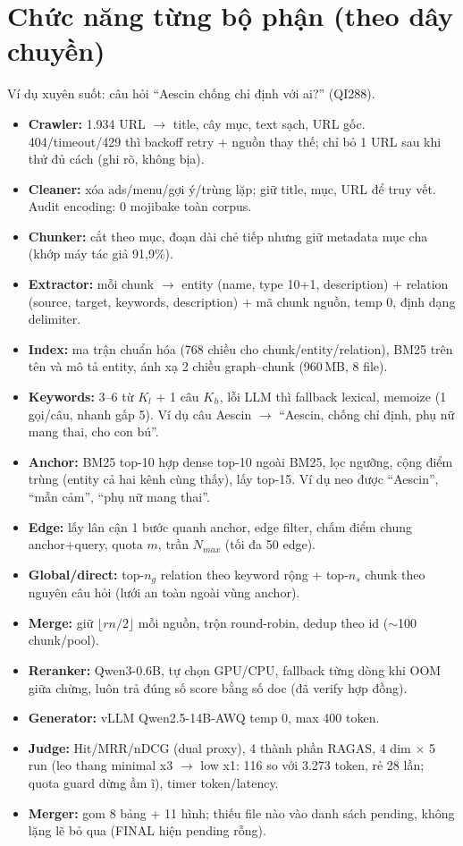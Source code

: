 \documentclass[12pt,a4paper]{article}
\begin{document}
\section{Chức năng từng bộ phận (theo dây chuyền)}
Ví dụ xuyên suốt: câu hỏi ``Aescin chống chỉ định với ai?'' (QI288).
\begin{itemize}[leftmargin=*]
\item \textbf{Crawler:} 1.934 URL $\rightarrow$ title, cây mục, text sạch, URL
gốc. 404/timeout/429 thì backoff retry + nguồn thay thế; chỉ bỏ 1 URL sau khi
thử đủ cách (ghi rõ, không bịa).
\item \textbf{Cleaner:} xóa ads/menu/gợi ý/trùng lặp; giữ title, mục, URL để
truy vết. Audit encoding: 0 mojibake toàn corpus.
\item \textbf{Chunker:} cắt theo mục, đoạn dài chẻ tiếp nhưng giữ metadata
mục cha (khớp máy tác giả 91,9\%).
\item \textbf{Extractor:} mỗi chunk $\rightarrow$ entity (name, type 10+1,
description) + relation (source, target, keywords, description) + mã chunk
nguồn, temp 0, định dạng delimiter.
\item \textbf{Index:} ma trận chuẩn hóa (768 chiều cho chunk/entity/relation),
BM25 trên tên và mô tả entity, ánh xạ 2 chiều graph--chunk (960\,MB, 8 file).
\item \textbf{Keywords:} 3--6 từ $K_l$ + 1 câu $K_h$, lỗi LLM thì fallback
lexical, memoize (1 gọi/câu, nhanh gấp 5). Ví dụ câu Aescin $\rightarrow$
``Aescin, chống chỉ định, phụ nữ mang thai, cho con bú''.
\item \textbf{Anchor:} BM25 top-10 hợp dense top-10 ngoài BM25, lọc ngưỡng,
cộng điểm trùng (entity cả hai kênh cùng thấy), lấy top-15. Ví dụ neo được
``Aescin'', ``mẫn cảm'', ``phụ nữ mang thai''.
\item \textbf{Edge:} lấy lân cận 1 bước quanh anchor, edge filter, chấm điểm
chung anchor+query, quota $m$, trần $N_{max}$ (tối đa 50 edge).
\item \textbf{Global/direct:} top-$n_g$ relation theo keyword rộng + top-$n_s$
chunk theo nguyên câu hỏi (lưới an toàn ngoài vùng anchor).
\item \textbf{Merge:} giữ $\lfloor rn/2\rfloor$ mỗi nguồn, trộn round-robin,
dedup theo id ($\sim$100 chunk/pool).
\item \textbf{Reranker:} Qwen3-0.6B, tự chọn GPU/CPU, fallback từng dòng khi
OOM giữa chừng, luôn trả đúng số score bằng số doc (đã verify hợp đồng).
\item \textbf{Generator:} vLLM Qwen2.5-14B-AWQ temp 0, max 400 token.
\item \textbf{Judge:} Hit/MRR/nDCG (dual proxy), 4 thành phần RAGAS, 4 dim
$\times$ 5 run (leo thang minimal x3 $\rightarrow$ low x1: 116 so với 3.273
token, rẻ 28 lần; quota guard dừng ầm ĩ), timer token/latency.
\item \textbf{Merger:} gom 8 bảng + 11 hình; thiếu file nào vào danh sách
pending, không lặng lẽ bỏ qua (FINAL hiện pending rỗng).
\end{itemize}
\end{document}
